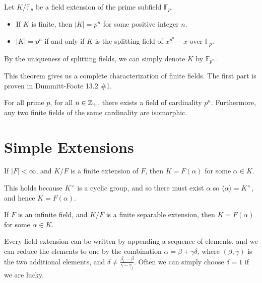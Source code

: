 \documentclass{memoir}
\begin{document}


\begin{thm}
	Let \(K / \mathbb{F}_p\) be a field extension of the prime subfield \(\mathbb{F}_p\).
	\begin{itemize}
		\item If \(K\) is finite, then \(\left| K \right| = p^{n}\) for some positive integer \(n\).
		\item \(\left| K \right| = p^{n}\) if and only if \(K\) is the splitting field of \(x^{p^{n}}-x\) over \(\mathbb{F}_p\).
	\end{itemize}
	By the uniqueness of splitting fields, we can simply denote \(K\) by \(\mathbb{F}_{p^{n}}\).
\end{thm}
This theorem gives us a complete characterization of finite fields. The first part is proven in Dummitt-Foote 13.2 \#1.

\begin{cor}
	For all prime \(p\), for all \(n \in \mathbb{Z}_+\), there exists a field of cardinality \(p^{n}\). Furthermore, any two finite fields of the same cardinality are isomorphic.
\end{cor}

\section{Simple Extensions}
\label{sec:simple_extensions}

\begin{thm}
	If \(\left| F \right| < \infty\), and \(K / F\) is a finite extension of \(F\), then \(K = F(\alpha )\) for some \(\alpha  \in K\).	
\end{thm}

This holds because \(K^{\times }\) is a cyclic group, and so there must exist \(\alpha \) so \(\langle \alpha  \rangle = K^{\times }\), and hence \(K = F(\alpha )\).

\begin{thm}
	If \(F\) is an infinite field, and \(K / F\) is a finite separable extension, then \(K = F(\alpha )\) for some \(\alpha  \in K\).
\end{thm}
Every field extension can be written by appending a sequence of elements, and we can reduce the elements to one by the combination \(\alpha  = \beta + \gamma  \delta \), where \((\beta ,\gamma )\) is the two additional elements, and \(\delta \neq \frac{\beta_i - \beta }{\gamma  - \gamma_j}\). Often we can simply choose \(\delta =1\) if we are lucky.
\end{document}
